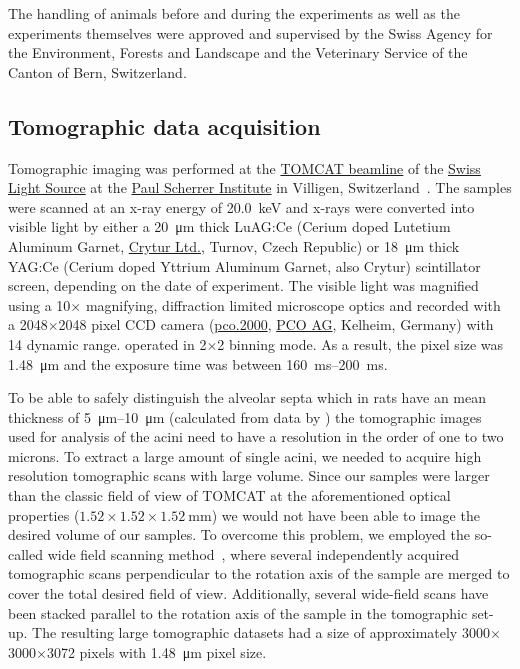 \documentclass[a4paper,DIVcalc,abstract,english]{scrartcl}
\begin{document}
The handling of animals before and during the experiments as well as the experiments themselves were approved and supervised by the Swiss Agency for the Environment, Forests and Landscape and the Veterinary Service of the Canton of Bern, Switzerland.

\subsection{Tomographic data acquisition}
Tomographic imaging was performed at the \href{http://www.psi.ch/sls/tomcat/}{TOMCAT beamline} of the \href{http://www.psi.ch/sls/}{Swiss Light Source} at the \href{http://www.psi.ch/}{Paul Scherrer Institute} in Villigen, Switzerland~\cite{Stampanoni2006a}.
The samples were scanned at an x-ray energy of \SI{20.0}{\kilo\electronvolt} and x-rays were converted into visible light by either a \SI{20}{\micro\meter} thick LuAG:Ce (Cerium doped Lutetium Aluminum Garnet, \href{http://www.crytur.cz/}{Crytur Ltd.}, Turnov, Czech Republic) or \SI{18}{\micro\meter} thick YAG:Ce (Cerium doped Yttrium Aluminum Garnet, also Crytur) scintillator screen, depending on the date of experiment.
The visible light was magnified using a 10\(\times\) magnifying, diffraction limited microscope optics and recorded with a 2048\(\times\)2048 pixel CCD camera (\href{http://www.pco.de/sensitive-cameras/pco2000/}{pco.2000}, \href{http://www.pco.de/}{PCO AG}, Kelheim, Germany) with \SI{14}{\bit} dynamic range. operated in 2\(\times\)2 binning mode.
As a result, the pixel size was \SI{1.48}{\micro\meter} and the exposure time was between \SIrange{160}{200}{\milli\second}.

To be able to safely distinguish the alveolar septa which in rats have an mean thickness of \SIrange{5}{10}{\micro\meter} (calculated from data by \citet{Burri1974}) the tomographic images used for analysis of the acini need to have a resolution in the order of one to two microns.
To extract a large amount of single acini, we needed to acquire high resolution tomographic scans with large volume.
Since our samples were larger than the classic field of view of TOMCAT at the aforementioned optical properties (\(1.52\times1.52\times\SI{1.52}{\milli\meter}\)) we would not have been able to image the desired volume of our samples.
To overcome this problem, we employed the so-called wide field scanning method~\cite{Haberthuer2010a}, where several independently acquired tomographic scans perpendicular to the rotation axis of the sample are merged to cover the total desired field of view.
Additionally, several wide-field scans have been stacked parallel to the rotation axis of the sample in the tomographic set-up.
The resulting large tomographic datasets had a size of approximately 3000\(\times\)3000\(\times\)3072 pixels with \SI{1.48}{\micro\meter} pixel size.
\end{document}
